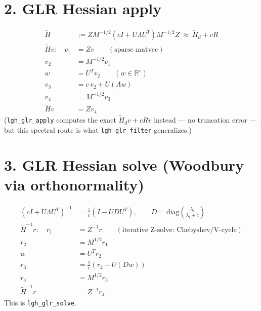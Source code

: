 \documentclass[11pt]{article}
\begin{document}
\section*{2. GLR Hessian apply}
\begin{align}
\widetilde{H} &:= Z M^{-1/2} \left( cI + U \Lambda U^T \right) M^{-1/2} Z
      \ \approx\ \widetilde{H}_d + cR\\
\widetilde{H} v:\quad
v_1 &= Z v \qquad (\text{sparse matvec})\\
v_2 &= M^{-1/2} v_1\\
w   &= U^T v_2 \qquad (w \in \mathbb{R}^r)\\
v_3 &= c\, v_2 + U (\Lambda w)\\
v_4 &= M^{-1/2} v_3\\
\widetilde{H} v &= Z v_4
\end{align}
(\texttt{lgh\_glr\_apply} computes the exact $\widetilde H_d v + cRv$ instead ---
no truncation error --- but this spectral route is what \texttt{lgh\_glr\_filter}
generalizes.)

\section*{3. GLR Hessian solve (Woodbury via orthonormality)}
\begin{align}
\left( cI + U \Lambda U^T \right)^{-1}
  &= \tfrac{1}{c}\left( I - U D U^T \right),
  \qquad D = \mathrm{diag}\!\left( \frac{\lambda_i}{\lambda_i + c} \right)\\
\widetilde{H}^{-1} r:\quad
r_1 &= Z^{-1} r \qquad (\text{iterative Z-solve: Chebyshev/V-cycle})\\
r_2 &= M^{1/2} r_1\\
w   &= U^T r_2\\
r_3 &= \tfrac{1}{c}\left( r_2 - U (D w) \right)\\
r_4 &= M^{1/2} r_3\\
\widetilde{H}^{-1} r &= Z^{-1} r_4
\end{align}
This is \texttt{lgh\_glr\_solve}.
\end{document}
